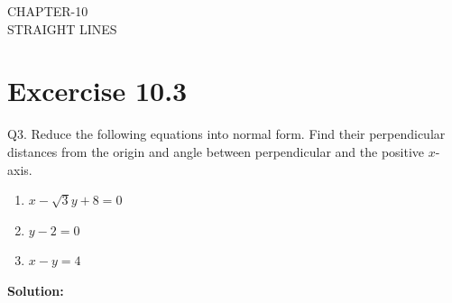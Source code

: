 \documentclass[12pt]{article}
\newcommand{\solution}{\noindent \textbf{Solution: }}
\begin{document}
\begin{center}
\textbf\large{CHAPTER-10 \\ STRAIGHT LINES}
\end{center}
\section*{Excercise 10.3}

Q3. Reduce the following equations into normal form. Find their perpendicular distances from the origin and angle between perpendicular and the positive $x$-axis.
\begin{enumerate}
	\item $x-\sqrt{3}y+8=0$ 
	\item $y-2=0$
	\item $x-y=4$
\end{enumerate}
\solution
\end{document}
